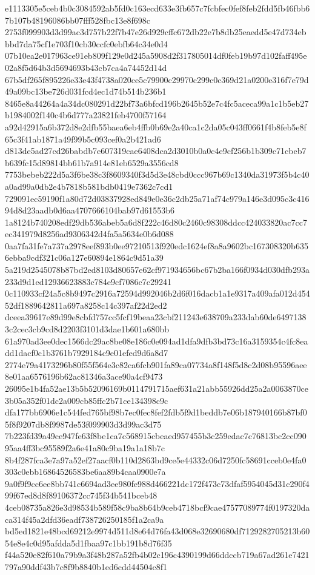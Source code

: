 \documentclass[11pt,a4paper]{article}
\begin{document}
{e1113305e5ceb4b0c3084592ab5fd0c163ecd633e3fb657c7fcbfec0fef8feb2fdd5fb46fbb67b107b48196086bb07fff528fbc13e8f698c
2753f099903d3d99ac3d757b22f7b47e26d929cffc672db22e7b8db25eaedd5e47d734ebbbd7da75cf1e703f10cb30ccfc0ebfb64c34e0d4
07b10ea2e017963ce91eb809f129e0d245a5908d2f317805014df0feb19b97d102faff495e02a8f5d64b3d5694693b43cb7ca4a74452d14d
67b5df265f895226e33e43f4738a020ce5c79900c29970c299c0c369d21a0200e316f7e79d49a09bc13be726d031fcd4ec1d74b514b236b1
8465e8a44264a4a34dc080291d22bf73a6bfcd196b2645b52e7c4fc5aceca99a1c1b5eb27b1984002f140c4b6d777a23821feb4700f57164
a92d42915a6b372d8e2dfb55baea6eb4ffb0b69e2a40ca1c2da05c043ff0661f4b8feb5e8f65c3f41ab1871a49f99b5c093cef0a2b421ad6
d813de5ad27cd26babdb7e607319cae6408dca2d3010b0a0c4e9cf256b1b309c71cbeb7b639fc15d89814bb61b7a914e81eb6529a3556cd8
7753bebeb222d5a3f6be38c3f8609340f3d5d3e48cbd0ccc967b69c1340da31973f5b4c40a0ad99a0db2e4b7818b581bdb0419e7362c7cd1
729091ec59190f1a80d72d03837928ed849e0e36c2db25a71af74c979a146e3d095c3c41694d8d23aadb0d6aa4707666104bab97d61553b6
1a8124b740208edf29db536abeb5a6d8f222c46d80c2460c98308ddcc424033820ac7cc7ec341979d8256ad9306342d4fa5a5634e0b6d088
0aa7fa31fe7a737a2978eef893b0ee97210513f920edc1624ef8a8a9602bc167308320b6356ebba9cdf321c06a127e60894e1864c9d51a39
5a219d2545078b87bd2ed8103d80657e62cf971934656bc67b2ba166f0934d030dfb293a233d9d1ed12936623883c784e9cf7086c7c29241
0c110933cf24a5c8b9497c2916a72594d992046b2d6f016dacb1a1e9317a409afa012d45452df1889642811a697a8258c14c397af22d2ed2
dceea39617e89d99e8cbfd757cc5fcf19beaa23cbf211243e638709a233dab60de64971383c2cec3cb9cd8d2203f3101d3dae1b601a680bb
61a970ad3ee0dec1566dc29ac8be08e186c0e094ad1dfa9dfb3bd73c16a3159354c4fc8eadd1dacf0c1b3761b7929184c9e01efed9d6a8d7
2774e79a4173296b80f55f564e3c82ca6fcb901fa89ca07734a8f148f5d8c2d08b95596aee8e01aa6576196b62ac81346a3ace90a4cf9473
26095e1b4fa52ae13b5b52096169b0114791715aef631a21abb55926dd25a2a0063870ce3b05a352f01dc2a009cb85ffc2b71ce134398c9c
dfa177bb6906e1c544fed765bf98b7ec0fec8fef2fdb5f9d1beddb7e06b187940166b87bf05f8f9207db8f9987de53f099903d3d99ac3d75
7b223fd39a49ce947fe63f8be1ca7c568915cbeaed957455b3c259edac7c76813bc2cc09095aa4ff3bc95589f2a6e41a80c9ba19a1a18b7c
8b4f287fca3e7a97a52ef27aacf0b110d2863bd9ce5e44332c06d7250fc58691cceb0e4fa0303c0ebb16864526583be6aa89b4caa0900e7a
9a0f9f9cc6ee8bb741c6694ad3ee980fe988d466221dc172f473c73dfaf5954045d31c290f499f67ed8d8f89106372cc745f34b541bceb48
4ceb08735a826e3d98534b589f58c9ba8b64b9ceb4718bcf9cae47577089774f0197320daca314f45a2dfd36eadf738726250185f1a2ca9a
bd5ed1821e48bcd69212e9974d511d8e64d76fa43d068e32690680df7129282705213b6054e8e4c0d95afdda5d1fbaa97c1bb191b8d76f35
f44a520e82f610a79b9a3f48b287a52fb4b02c196c4390199d66ddccb719a67ad261e7421797a90ddf43b7c8f9b8840b1ed6cdd44504c8f1
}
\end{document}
